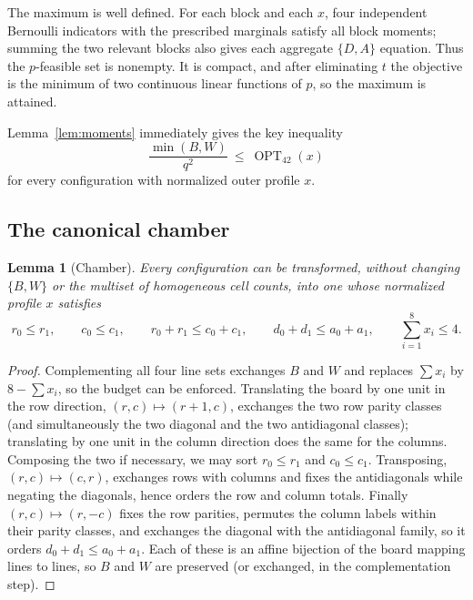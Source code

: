 \documentclass[11pt]{amsart}
\newtheorem{lemma}[theorem]{Lemma}
\theoremstyle{definition}
\theoremstyle{remark}
\newcommand{\OPT}{\operatorname{OPT}_{42}}
\begin{document}
The maximum is well defined.  For each block and each $x$, four independent
Bernoulli indicators with the prescribed marginals satisfy all block
moments; summing the two relevant blocks also gives each aggregate
$\{D,A\}$ equation.  Thus the $p$-feasible set is nonempty.  It is compact,
and after eliminating $t$ the objective is the minimum of two continuous
linear functions of $p$, so the maximum is attained.

Lemma~\ref{lem:moments} immediately gives the key inequality
\begin{equation}\label{eq:opt}
\frac{\min(B,W)}{q^2}\ \le\ \OPT(x)
\end{equation}
for every configuration with normalized outer profile $x$.

\subsection{The canonical chamber}

\begin{lemma}[Chamber]\label{lem:chamber}
Every configuration can be transformed, without changing $\{B,W\}$ or the multiset of homogeneous cell counts, into one whose normalized profile $x$ satisfies
\begin{equation}\label{eq:chamber}
r_0\le r_1,\qquad c_0\le c_1,\qquad r_0+r_1\le c_0+c_1,\qquad d_0+d_1\le a_0+a_1,\qquad \sum_{i=1}^{8}x_i\le4 .
\end{equation}
\end{lemma}

\begin{proof}
Complementing all four line sets exchanges $B$ and $W$ and replaces $\sum x_i$ by $8-\sum x_i$, so the budget can be enforced. Translating the board by one unit in the row direction, $(r,c)\mapsto(r+1,c)$, exchanges the two row parity classes (and simultaneously the two diagonal and the two antidiagonal classes); translating by one unit in the column direction does the same for the columns. Composing the two if necessary, we may sort $r_0\le r_1$ and $c_0\le c_1$. Transposing, $(r,c)\mapsto(c,r)$, exchanges rows with columns and fixes the antidiagonals while negating the diagonals, hence orders the row and column totals. Finally $(r,c)\mapsto(r,-c)$ fixes the row parities, permutes the column labels within their parity classes, and exchanges the diagonal with the antidiagonal family, so it orders $d_0+d_1\le a_0+a_1$. Each of these is an affine bijection of the board mapping lines to lines, so $B$ and $W$ are preserved (or exchanged, in the complementation step).
\end{proof}
\end{document}
